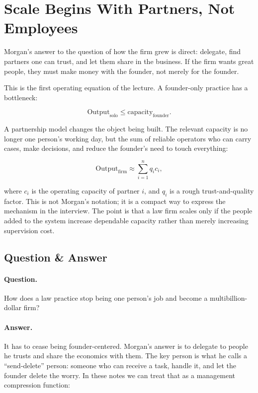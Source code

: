 \section{Scale Begins With Partners, Not Employees}

Morgan's answer to the question of how the firm grew is direct: delegate, find partners one can trust, and let them share in the business. If the firm wants great people, they must make money with the founder, not merely for the founder.

This is the first operating equation of the lecture. A founder-only practice has a bottleneck:

\begin{equation}
\mathrm{Output}_{\mathrm{solo}} \leq \mathrm{capacity}_{\mathrm{founder}}.
\end{equation}

A partnership model changes the object being built. The relevant capacity is no longer one person's working day, but the sum of reliable operators who can carry cases, make decisions, and reduce the founder's need to touch everything:

\begin{equation}
\mathrm{Output}_{\mathrm{firm}} \approx \sum_{i=1}^{n} q_i c_i,
\end{equation}

where \(c_i\) is the operating capacity of partner \(i\), and \(q_i\) is a rough trust-and-quality factor. This is not Morgan's notation; it is a compact way to express the mechanism in the interview. The point is that a law firm scales only if the people added to the system increase dependable capacity rather than merely increasing supervision cost.

\subsection{Question \& Answer}

\paragraph{Question.}
How does a law practice stop being one person's job and become a multibillion-dollar firm?

\paragraph{Answer.}
It has to cease being founder-centered. Morgan's answer is to delegate to people he trusts and share the economics with them. The key person is what he calls a ``send-delete'' person: someone who can receive a task, handle it, and let the founder delete the worry. In these notes we can treat that as a management compression function:


